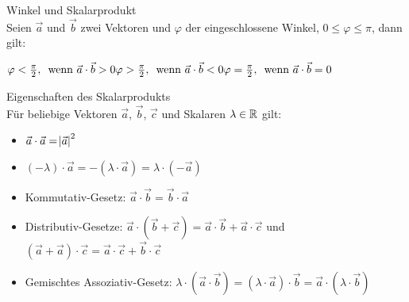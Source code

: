 \begin{minipage}{0.55\linewidth}
\begin{concept}{Winkel und Skalarprodukt}\\
    Seien $\vec{a}$ und $\vec{b}$ zwei Vektoren und $\varphi$ der eingeschlossene Winkel, 
    $0\leq\varphi\leq\pi$, dann gilt:
\end{concept}
\end{minipage}
\begin{minipage}{0.35\linewidth}
    $\varphi<\frac{\pi}{2},\, \text{ wenn } \vec{a}\cdot\vec{b} > 0 \\  
    \varphi>\frac{\pi}{2},\, \text{ wenn } \vec{a}\cdot\vec{b} < 0 \\   
    \varphi=\frac{\pi}{2},\, \text{ wenn } \vec{a}\cdot\vec{b} = 0 $
\end{minipage}

\begin{theorem}{Eigenschaften des Skalarprodukts}\\ Für beliebige Vektoren $\vec{a}$, $\vec{b}$, $\vec{c}$ und Skalaren $\lambda\in\mathbb{R}$ gilt:
    \begin{itemize}
        \item $\vec{a}\cdot\vec{a}=\abs{\vec{a}}^2$
        \item $(-\lambda)\cdot\vec{a}=-(\lambda\cdot\vec{a})=\lambda\cdot(-\vec{a})$
        \item Kommutativ-Gesetz: $\vec{a}\cdot\vec{b}=\vec{b}\cdot\vec{a}$
        \item Distributiv-Gesetze: $\vec{a}\cdot(\vec{b}+\vec{c})=\vec{a}\cdot\vec{b}+\vec{a}\cdot\vec{c}$ und $(\vec{a}+\vec{a})\cdot\vec{c}=\vec{a}\cdot\vec{c}+\vec{b}\cdot\vec{c}$
        \item Gemischtes Assoziativ-Gesetz: $\lambda\cdot(\vec{a}\cdot\vec{b})=(\lambda\cdot\vec{a})\cdot\vec{b}=\vec{a}\cdot(\lambda\cdot\vec{b})$
    \end{itemize} 
\end{theorem}

